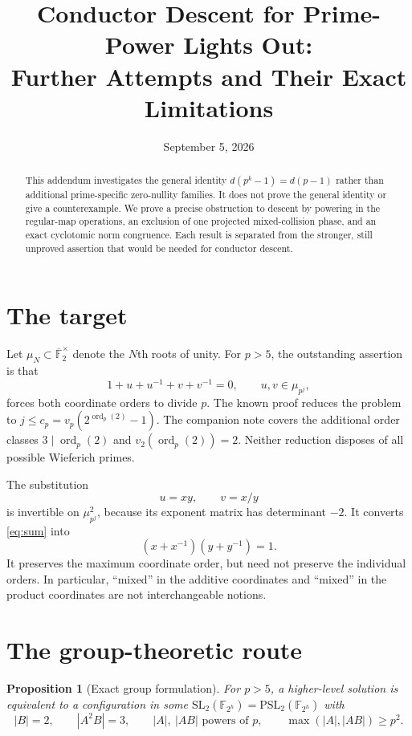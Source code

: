 \documentclass[a4paper]{article}
\title{Conductor Descent for Prime-Power Lights Out:\\
Further Attempts and Their Exact Limitations}
\author{}
\date{September 5, 2026}
\newtheorem{proposition}[theorem]{Proposition}
\DeclareMathOperator{\ord}{ord}
\newcommand{\F}{\mathbb F}
\begin{document}
\maketitle

\begin{abstract}
This addendum investigates the general identity
$d(p^k-1)=d(p-1)$ rather than additional prime-specific
zero-nullity families.  It does not prove the general identity or
give a counterexample.
We prove a precise obstruction to descent by powering in the regular-map
operations, an exclusion of one projected mixed-collision phase, and an
exact cyclotomic norm congruence.  Each result is separated from the
stronger, still unproved assertion that would be needed for conductor
descent.
\end{abstract}

\section{The target}

Let $\mu_N\subset\overline{\F}_2^\times$ denote the $N$th roots of unity.
For $p>5$, the outstanding assertion is that
\begin{equation}\label{eq:sum}
 1+u+u^{-1}+v+v^{-1}=0,\qquad u,v\in\mu_{p^j},
\end{equation}
forces both coordinate orders to divide $p$.
The known proof reduces the problem to
$j\leq c_p=v_p(2^{\ord_p(2)}-1)$.
The companion note \cite{endpoint} covers the additional order classes
$3\mid\ord_p(2)$ and $v_2(\ord_p(2))=2$.
Neither reduction disposes of all possible Wieferich primes.

The substitution
\[
 u=xy,\qquad v=x/y
\]
is invertible on $\mu_{p^j}^2$, because its exponent matrix has
determinant $-2$.  It converts \eqref{eq:sum} into
\begin{equation}\label{eq:product}
 (x+x^{-1})(y+y^{-1})=1.
\end{equation}
It preserves the maximum coordinate order, but need not preserve the
individual orders.  In particular, ``mixed'' in the additive coordinates
and ``mixed'' in the product coordinates are not interchangeable
notions.

\section{The group-theoretic route}

\begin{proposition}[Exact group formulation]\label{prop:group}
For $p>5$, a higher-level solution is equivalent to a configuration in
some $\mathrm{SL}_2(\F_{2^h})=\mathrm{PSL}_2(\F_{2^h})$ with
\[
 |B|=2,\qquad |A^2B|=3,\qquad
 |A|,\ |AB|\text{ powers of }p,
 \qquad \max(|A|,|AB|)\geq p^2.
\]
\end{proposition}
\end{document}
